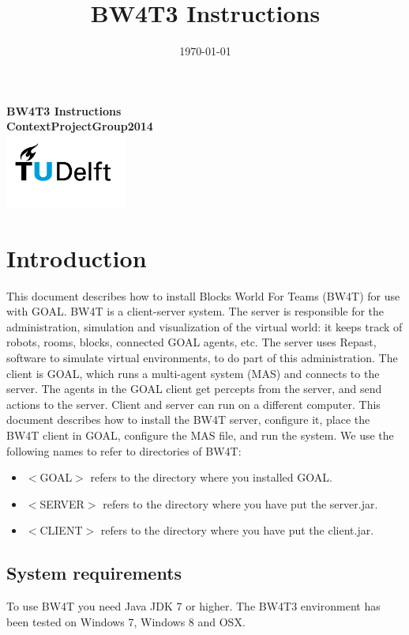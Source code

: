 \documentclass[11pt,a4paper]{article}
\title{BW4T3 Instructions}
\date{\today}
\begin{document}
\begin{titlepage}
    \centering
    \vfill
    {\bfseries\Large
        BW4T3 Instructions\\
        \vskip2cm
        ContextProjectGroup2014\\
    }    
    \vfill
    \includegraphics[width=4cm]{TUD.png}
    \vfill
    \vfill
\end{titlepage}

\tableofcontents

\newpage

\section{Introduction}
This document describes how to install Blocks World For Teams (BW4T) for use with GOAL. BW4T is a client-server system. The server is responsible for the administration, simulation and visualization of the virtual world: it keeps track of robots, rooms, blocks, connected GOAL agents, etc. The server uses Repast, software to simulate virtual environments, to do part of this administration. The client is GOAL, which runs a multi-agent system (MAS) and connects to the server. The agents in the GOAL client get percepts from the server, and send actions to the server. Client and server can run on a different computer. This document describes how to install the BW4T server, configure it, place the BW4T client in GOAL, configure the MAS file, and run the system.
We use the following names to refer to directories of BW4T:
\begin{itemize}
\item $<$GOAL$>$ refers to the directory where you installed GOAL.
\item $<$SERVER$>$ refers to the directory where you have put the server.jar.
\item $<$CLIENT$>$ refers to the directory where you have put the client.jar.
\end{itemize}

\subsection{System requirements}
To use BW4T you need Java JDK 7 or higher. The BW4T3 environment has been tested on Windows 7, Windows 8 and OSX.
\end{document}
